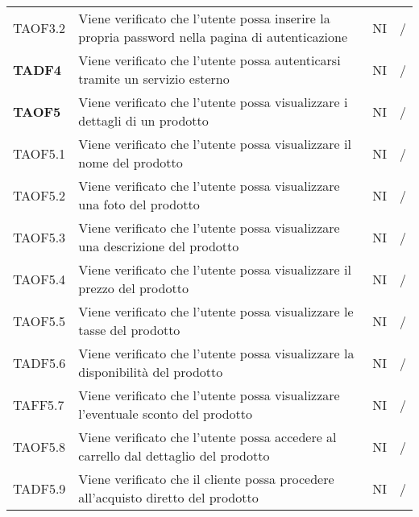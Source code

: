 \begin{center}
\begin{longtable}[!h]{p{60px} p{240px} p{35px} p{35px}}
        TAOF3.2         & Viene verificato che l'utente possa inserire la propria password nella pagina di autenticazione                      & NI             & /              \\
        \textbf{TADF4}  & Viene verificato che l'utente possa autenticarsi tramite un servizio esterno                                         & NI             & /              \\
        \textbf{TAOF5}  & Viene verificato che l'utente possa visualizzare i dettagli di un prodotto                                           & NI             & /              \\
        TAOF5.1         & Viene verificato che l'utente possa visualizzare il nome del prodotto                                                & NI             & /              \\
        TAOF5.2         & Viene verificato che l'utente possa visualizzare una foto del prodotto                                               & NI             & /              \\
        TAOF5.3         & Viene verificato che l'utente possa visualizzare una descrizione del prodotto                                        & NI             & /              \\
        TAOF5.4         & Viene verificato che l'utente possa visualizzare il prezzo del prodotto                                              & NI             & /              \\
        TAOF5.5         & Viene verificato che l'utente possa visualizzare le tasse del prodotto                                               & NI             & /              \\
        TADF5.6         & Viene verificato che l'utente possa visualizzare la disponibilità del prodotto                                       & NI             & /              \\
        TAFF5.7         & Viene verificato che l'utente possa visualizzare l'eventuale sconto del prodotto                                     & NI             & /              \\
        TAOF5.8         & Viene verificato che l'utente possa accedere al carrello dal dettaglio del prodotto                                  & NI             & /              \\
        TADF5.9         & Viene verificato che il cliente possa procedere all'acquisto diretto del prodotto                                    & NI             & /              \\

\end{longtable}
\end{center}
